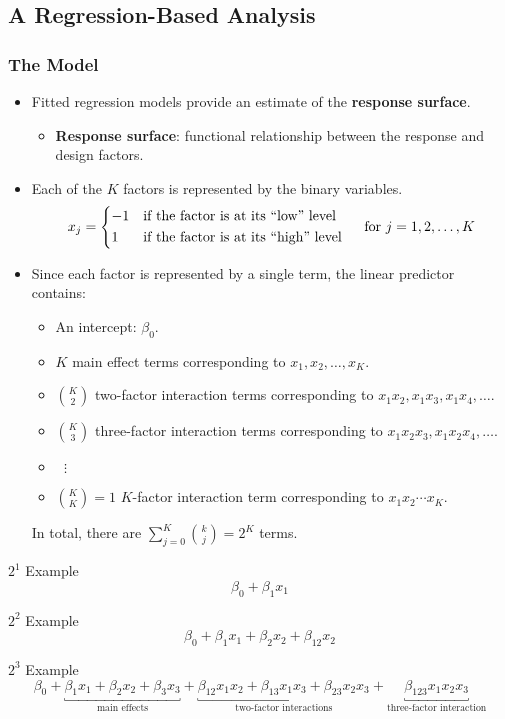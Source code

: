 \subsection{A Regression-Based Analysis}
\subsubsection*{The Model}
\begin{itemize}
    \item Fitted regression models provide an estimate of the \textbf{response surface}.
          \begin{itemize}[$\hookrightarrow$]
              \item \textbf{Response surface}: functional relationship between the response and design factors.
          \end{itemize}
    \item Each of the $K$ factors is represented by the binary variables.
          \[ x_j=\begin{cases*}
                  -1 & if the factor is at its ``low'' level  \\
                  1  & if the factor is at its ``high'' level
              \end{cases*}\quad \text{for }j=1,2,\ldots,K \]
    \item Since each factor is represented by a single term, the linear predictor contains:
          \begin{itemize}
              \item An intercept: $ \beta_0 $.
              \item $ K $ main effect terms corresponding to $ x_1,x_2,\ldots,x_K $.
              \item $ \binom{K}{2} $ two-factor interaction terms corresponding to $ x_1x_2,x_1x_3,x_1x_4,\ldots $.
              \item $ \binom{K}{3} $ three-factor interaction terms corresponding to $ x_1x_2x_3,x_1x_2x_4,\ldots $.
              \item $ \:\:\,\vdots $
              \item $ \binom{K}{K}=1 $ $ K $-factor interaction term corresponding to $ x_1x_2\cdots x_K $.
          \end{itemize}
          In total, there are $ \sum_{j=0}^{K} \binom{k}{j}=2^K $ terms.
\end{itemize}
\begin{Example}{$ 2^1 $ Example}{}
    \[ \beta_0+\beta_1x_1 \]
\end{Example}
\begin{Example}{$ 2^2 $ Example}{}
    \[ \beta_0+\beta_1x_1+\beta_2x_2+\beta_{12}x_2 \]
\end{Example}
\begin{Example}{$ 2^3 $ Example}{}
    \[ \beta_0+\underbracket{\beta_1x_1+\beta_2x_2+\beta_3x_3}_{\text{main effects}}+
        \underbracket{\beta_{12}x_1x_2+\beta_{13}x_1x_3+\beta_{23}x_2x_3}_{\text{two-factor interactions}}+
        \underbracket{\beta_{123}x_1x_2x_3}_{\text{three-factor interaction}} \]
\end{Example}
